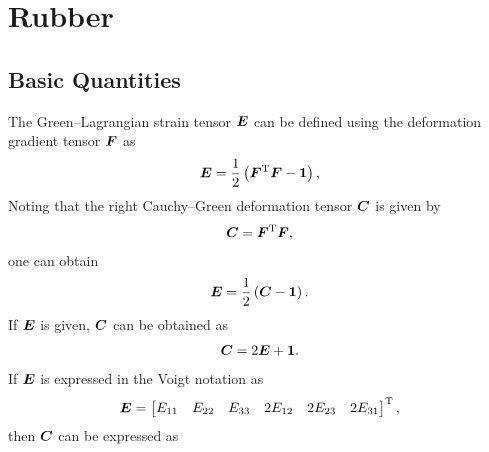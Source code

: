 \chapter{Rubber}
\section{Basic Quantities}
The Green--Lagrangian strain tensor $\bm{E}$ can be defined using the deformation gradient tensor $\bm{F}$ as
\begin{gather}
    \bm{E}=\dfrac{1}{2}\left(\bm{F}^{\mathrm{T}}\bm{F}-\bm{1}\right),
\end{gather}
Noting that the right Cauchy--Green deformation tensor $\bm{C}$ is given by
\begin{gather}
    \bm{C}=\bm{F}^{\mathrm{T}}\bm{F},
\end{gather}
one can obtain
\begin{gather}
    \bm{E}=\dfrac{1}{2}\left(\bm{C}-\bm{1}\right).
\end{gather}
If $\bm{E}$ is given, $\bm{C}$ can be obtained as
\begin{gather}
    \bm{C}=2\bm{E}+\bm{1}.
\end{gather}
If $\bm{E}$ is expressed in the Voigt notation as
\begin{gather}
    \bm{E}=\begin{bmatrix}
        E_{11} & E_{22} & E_{33} & 2E_{12} & 2E_{23} & 2E_{31}
    \end{bmatrix}^{\mathrm{T}},
\end{gather}
then $\bm{C}$ can be expressed as
